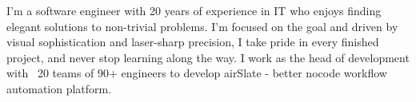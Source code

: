 
\begin{cvparagraph}

I'm a software engineer with 20 years of experience in IT who enjoys
finding elegant solutions to non-trivial problems. I'm focused on the
goal and driven by visual sophistication and laser-sharp precision, I
take pride in every finished project, and never stop learning along
the way. I work as the head of development with ~20 teams of 90+
engineers to develop airSlate - better nocode workflow automation
platform.

\end{cvparagraph}
